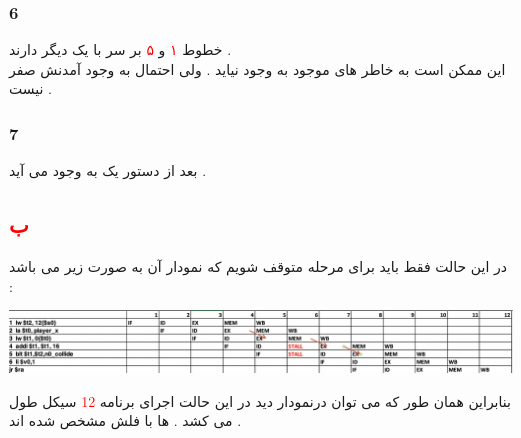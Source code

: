 \documentclass{article}
\begin{document}
\subsubsection*{6}
خطوط 
\textcolor{red}{۱} 
و 
\textcolor{red}{۵}
بر سر 
با یک دیگر 
\textcolor{blue}{}
دارند . 
\\
این 
ممکن است  به خاطر 
های موجود به وجود نیاید . ولی احتمال به وجود آمدنش صفر نیست  .
\subsubsection*{7}
بعد از دستور 
یک 
\textcolor{blue}{}
به وجود می آید . 
\subsection*{\textcolor{red}{ب}}
در این حالت فقط باید برای مرحله 
متوقف شویم که نمودار آن  به صورت زیر می باشد :‌

 
 \begin{center}
 	\includegraphics[width=1.1\textwidth]{q9p2a}
 \end{center}
بنابراین همان طور که می توان درنمودار دید در این حالت اجرای برنامه 
\textcolor{red}{12}
سیکل طول می کشد . 
ها با فلش مشخص شده اند  . 
\end{document}
